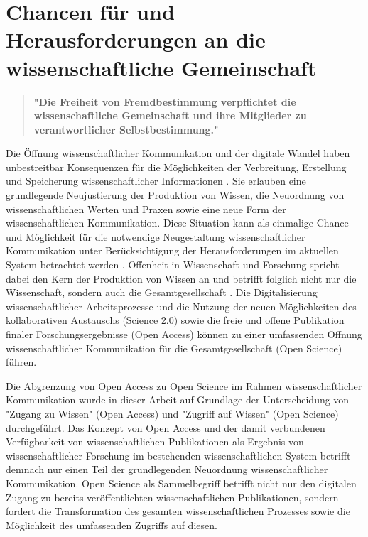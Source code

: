 \section{Chancen für und Herausforderungen an die wissenschaftliche Gemeinschaft}

\begin{quote}
\textbf{"Die Freiheit von Fremdbestimmung verpflichtet die wissenschaftliche Gemeinschaft und ihre Mitglieder zu verantwortlicher Selbstbestimmung."}
\end{quote} \cite[:69]{Oezmen_2015}

Die Öffnung wissenschaftlicher Kommunikation und der digitale Wandel haben unbestreitbar Konsequenzen für die Möglichkeiten der Verbreitung, Erstellung und Speicherung wissenschaftlicher Informationen \cite[:233]{Gould_2009}. Sie erlauben eine grundlegende Neujustierung der Produktion von Wissen, die Neuordnung von wissenschaftlichen Werten und Praxen sowie eine neue Form der wissenschaftlichen Kommunikation. Diese Situation kann als einmalige Chance und Möglichkeit für die notwendige Neugestaltung wissenschaftlicher Kommunikation unter Berücksichtigung der Herausforderungen im aktuellen System betrachtet werden \cite{Naeder_2010}. Offenheit in Wissenschaft und Forschung spricht dabei den Kern der Produktion von Wissen an und betrifft folglich nicht nur die Wissenschaft, sondern auch die Gesamtgesellschaft \cite{Mussell_2013}. Die Digitalisierung wissenschaftlicher Arbeitsprozesse und die Nutzung der neuen Möglichkeiten des kollaborativen Austauschs (Science 2.0) sowie die freie und offene Publikation finaler Forschungsergebnisse (Open Access) können zu einer umfassenden Öffnung wissenschaftlicher Kommunikation für die Gesamtgesellschaft (Open Science) führen.

Die Abgrenzung von Open Access zu Open Science im Rahmen wissenschaftlicher Kommunikation wurde in dieser Arbeit auf Grundlage der Unterscheidung von "Zugang zu Wissen" (Open Access) und "Zugriff auf Wissen" (Open Science) durchgeführt. Das Konzept von Open Access und der damit verbundenen Verfügbarkeit von wissenschaftlichen Publikationen als Ergebnis von wissenschaftlicher Forschung im bestehenden wissenschaftlichen System betrifft demnach nur einen Teil der grundlegenden Neuordnung wissenschaftlicher Kommunikation. Open Science als Sammelbegriff betrifft nicht nur den digitalen Zugang zu bereits veröffentlichten wissenschaftlichen Publikationen, sondern fordert die Transformation des gesamten wissenschaftlichen Prozesses sowie die Möglichkeit des umfassenden Zugriffs auf diesen.

